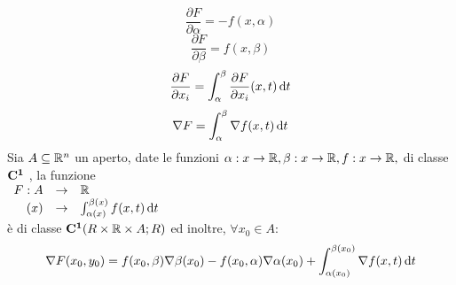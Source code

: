 $$\frac{\partial F}{\partial \alpha}=-f(x,\alpha)$$
$$\frac{\partial F}{\partial \beta}=f(x,\beta)$$
$$\frac{\partial F}{\partial x_i}=\int_{\alpha}^{\beta}\frac{\partial F}{\partial x_i}(x,t)\,\mathrm{d}{t}$$
$$\nabla F=\int_{\alpha}^{\beta}\nabla f(x,t)\,\mathrm{d}{t}$$
\corollary
Sia $A\subseteq \mathbb{R}^n$ un aperto, date le funzioni $\alpha:x\rightarrow \mathbb{R}, \beta:x\rightarrow \mathbb{R}, f:x\rightarrow \mathbb{R}, $ di classe $\mathbf{C^{1}}$ , la funzione \\
$\begin{array}{rcl} F: A & \to & \mathbb{R} \\ (x) & \to & \int_{\alpha(x)}^{\beta(x)}f(x,t)\,\mathrm{d}{t} \end{array}$\\
è di classe $\mathbf{C^{1}}(R\times \mathbb{R}\times A;R)$ ed inoltre, $\forall x_0 \in A$:
$$\nabla F(x_0,y_0)=f(x_0,\beta)\nabla\beta(x_0)-f(x_0,\alpha)\nabla\alpha(x_0)+\int_{\alpha(x_0)}^{\beta(x_0)}\nabla f(x,t)\,\mathrm{d}{t}$$

